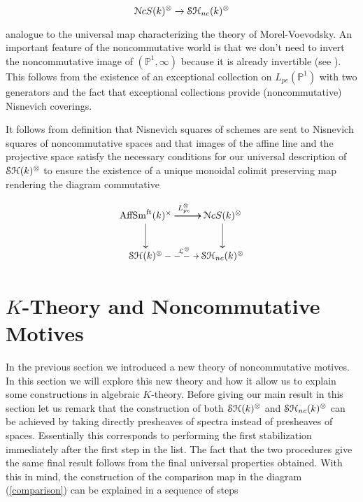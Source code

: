 \begin{refsection}
$$\mathcal{N}cS(k)^{\otimes}\to \mathcal{S}\mathcal{H}_{nc}(k)^{\otimes}$$

\noindent analogue to the universal map characterizing the theory of Morel-Voevodsky. An important feature of the noncommutative world is that we don't need to invert the noncommutative image of $(\mathbb{P}^1,\infty)$ because it is already invertible  (see \cite[6.55]{nc1}). This follows from the existence of an exceptional collection on $L_{pe}(\mathbb{P}^1)$ with two generators and the fact that exceptional collections provide (noncommutative) Nisnevich coverings.

It follows from definition that Nisnevich squares of schemes are sent to Nisnevich squares of noncommutative spaces and that images of the affine line and the projective space satisfy the necessary conditions for our universal description of $\mathcal{S}\mathcal{H}(k)^{\otimes}$ to ensure the existence of a unique monoidal colimit preserving map rendering the diagram commutative

\begin{equation}
\label{comparison}
\xymatrix{
\aff^{\times}\ar[r]^{L_{pe}^{\otimes}}\ar[r]\ar[d]& \nck^{\otimes}\ar[d]\\
\stmonoidalk\ar@{-->}[r]^{\mathcal{L}^{\otimes}}&\stncmonoidalk
}
\end{equation}


\section{$K$-Theory and Noncommutative Motives}

In the previous section we introduced a new theory of noncommutative motives. In this section we will explore this new theory and how it allow us to explain some constructions in algebraic $K$-theory. Before giving our main result in this section let us remark that the construction of both $\mathcal{S}\mathcal{H}(k)^{\otimes}$ and $\mathcal{S}\mathcal{H}_{nc}(k)^{\otimes}$ can be achieved by taking directly presheaves of spectra instead of presheaves of spaces. Essentially this corresponds to performing the first stabilization immediately after the first step in the list. The fact that the two procedures give the same final result follows from the final universal properties obtained. With this in mind, the construction of the comparison map in the diagram (\ref{comparison}) can be explained in a sequence of steps



\end{refsection}
